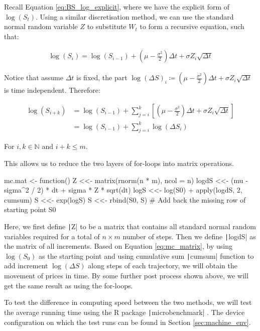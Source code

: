 Recall Equation \ref{eq:BS_log_explicit}, where we have the explicit form of $\log(S_t)$. Using a similar discretisation method, we can use the standard normal random variable $Z$ to substitute $W_t$ to form a recursive equation, such that:

\begin{align*}
\log(S_i) = \log(S_{i-1}) + (\mu - \frac{\sigma^2}{2})\Delta t + \sigma Z_i \sqrt{\Delta t}
\end{align*}

Notice that assume $\Delta t$ is fixed, the part $\log(\Delta S)_i\coloneqq(\mu - \frac{\sigma^2}{2})\Delta t + \sigma Z_i \sqrt{\Delta t}$ is time independent. Therefore:

\begin{align}
\log(S_{i+k}) &= \log(S_{i-1}) + \sum_{j=i}^{k}{\left[(\mu - \frac{\sigma^2}{2})\Delta t + \sigma Z_i \sqrt{\Delta t}\right]} \\
&= \log(S_{i-1}) + \sum_{j=i}^{k}{\log(\Delta S_i)} \label{eq:mc_matrix}
\end{align}

For $i,k\in\mathbb{N}$ and $i+k\leq m$.

This allows us to reduce the two layers of for-loops into matrix operations.

\begin{Rminted}
mc.mat <- function() {
    Z <<- matrix(rnorm(n * m), ncol = n)
    logdS <<- (mu - sigma^2 / 2) * dt + sigma * Z * sqrt(dt)
    logS <<- log(S0) + apply(logdS, 2, cumsum)
    S <<- exp(logS)
    S <<- rbind(S0, S) # Add back the missing row of starting point S0
}
\end{Rminted}

Here, we first define \texttt|Z| to be a matrix that contains all standard normal random variables required for a total of $n\times m$ number of steps. Then we define \texttt|logdS| as the matrix of all increments. Based on Equation \ref{eq:mc_matrix}, by using $\log(S_0)$ as the starting point and using cumulative sum \texttt|cumsum| function to add increment $\log(\Delta S)$ along steps of each trajectory, we will obtain the movement of prices in time. By some further post process shown above, we will get the same result as using the for-loops.

To test the difference in computing speed between the two methods, we will test the average running time using the R package \texttt|microbenchmark| \cite{Mersmann2022}. The device configuration on which the test runs can be found in Section \ref{sec:machine_env}.

